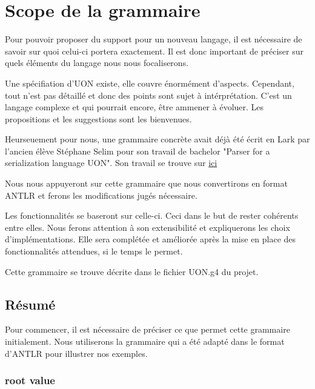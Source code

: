 \documentclass[
    iict, %
    il, %
]{heig-tb}
\begin{document}


\chapter{Scope de la grammaire}\label{grammar scope}
Pour pouvoir proposer du support pour un nouveau langage, il est nécessaire de savoir sur quoi celui-ci portera exactement.
Il est donc important de préciser sur quels éléments du langage nous nous focaliserons.

Une spécifiation d'UON existe, elle couvre énormément d'aspects. Cependant, tout n'est pas détaillé et donc des points sont sujet à intérprétation.
C'est un langage complexe et qui pourrait encore, être ammener à évoluer. Les propositions et les suggestions sont les bienvenues.

Heurseuement pour nous, une grammaire concrète avait déjà été écrit en Lark par l'ancien élève Stéphane Selim pour son travail de bachelor "Parser for a serialization language UON".
Son travail se trouve sur \href{https://github.com/uon-language/uon-parser}{ici}

Nous nous appuyeront sur cette grammaire que nous convertirons en format ANTLR et ferons les modifications jugés nécessaire.

Les fonctionnalités se baseront sur celle-ci. Ceci dans le but de rester cohérents entre elles.
Nous ferons attention à son extensibilité et expliquerons les choix d'implémentations.
Elle sera complétée et améliorée après la mise en place des fonctionnalités attendues, si le temps le permet.

Cette grammaire se trouve décrite dans le fichier UON.g4 du projet.

\section{Résumé}
Pour commencer, il est nécessaire de préciser ce que permet cette grammaire initialement.
Nous utiliserons la grammaire qui a été adapté dans le format d'ANTLR pour illustrer nos exemples.


\subsection{root value}
\end{document}
